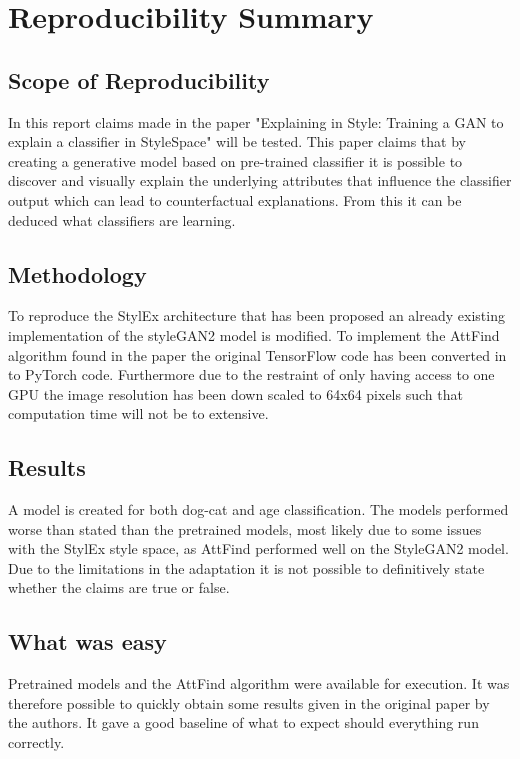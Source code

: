 \section*{Reproducibility Summary}

\subsection*{Scope of Reproducibility}
In this report claims made in the paper "Explaining in Style: Training a GAN to explain a classifier in StyleSpace" will be tested. This paper claims that by creating a generative model based on pre-trained classifier it is possible to discover and visually explain the underlying attributes that influence the classifier output which can lead to counterfactual explanations. From this it can be deduced what classifiers are learning.

\subsection*{Methodology}
To reproduce the StylEx architecture that has been proposed an already existing implementation of the  styleGAN2 model is modified. To implement the AttFind algorithm found in the paper the original TensorFlow code has been converted in to PyTorch code. Furthermore due to the restraint of only having access to one GPU the image resolution has been down scaled to 64x64 pixels such that computation time will not be to extensive.

\subsection*{Results}
A model is created for both dog-cat and age classification. The models performed worse than stated than the pretrained models, most likely due to some issues with the StylEx style space, as AttFind performed well on the StyleGAN2 model. Due to the limitations in the adaptation it is not possible to definitively state whether the claims are true or false.

\subsection*{What was easy}
Pretrained models and the AttFind algorithm were available for execution. It was therefore possible to quickly obtain some results given in the original paper by the authors. It gave a good baseline of what to expect should everything run correctly.

